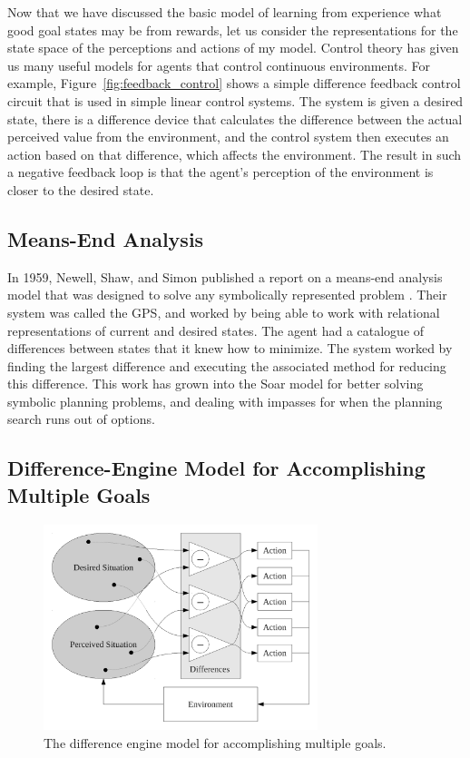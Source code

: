Now that we have discussed the basic model of learning from experience
what good goal states may be from rewards, let us consider the
representations for the state space of the perceptions and actions of
my model.  Control theory has given us many useful models for agents
that control continuous environments.  For example,
Figure~\ref{fig:feedback_control} shows a simple difference feedback
control circuit that is used in simple linear control systems.  The
system is given a desired state, there is a difference device that
calculates the difference between the actual perceived value from the
environment, and the control system then executes an action based on
that difference, which affects the environment.  The result in such a
negative feedback loop is that the agent's perception of the
environment is closer to the desired state.

\subsection{Means-End Analysis}

In 1959, Newell, Shaw, and Simon published a report on a means-end
analysis model that was designed to solve any symbolically represented
problem \citep{newell:1959}.  Their system was called the \ac{GPS},
and worked by being able to work with relational representations of
current and desired states.  The agent had a catalogue of differences
between states that it knew how to minimize.  The system worked by
finding the largest difference and executing the associated method for
reducing this difference.  This work has grown into the Soar model
\citep{newell:1990} for better solving symbolic planning problems, and
dealing with impasses for when the planning search runs out of
options.

\subsection{Difference-Engine Model for Accomplishing Multiple Goals}

\begin{figure}[bth]
  \center
  \includegraphics[height=6cm]{gfx/difference_engine_feedback_control}
  \caption[The difference engine model for accomplishing multiple goals]{The difference engine model for accomplishing multiple goals.}
  \label{fig:difference_engine_feedback_control}
\end{figure}

